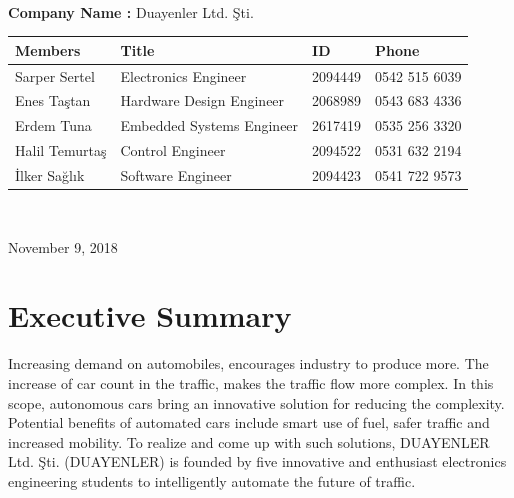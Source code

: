 \documentclass[a4paper,12pt]{article}
\begin{document}
\begin{titlepage}
\begin{minipage}[r]{0.35\textwidth}
\end{minipage}\\[1cm]
\begin{minipage}{\textwidth}
	\begin{flushleft}
		\large{\textbf{Company Name :}}	Duayenler Ltd. Şti.\\
		\begin{table}[H]
			\begin{tabular}{l l l l}
				\hline
				\textbf{Members}&\textbf{Title}& \textbf{ID}&\textbf{Phone} \\ \hline
				Sarper Sertel & Electronics Engineer& 2094449 & 0542 515 6039  \\ 
				Enes Taştan & Hardware Design Engineer & 2068989 & 0543 683 4336  \\ 
				Erdem Tuna & Embedded Systems Engineer& 2617419 & 0535 256 3320  \\ 
				Halil Temurtaş & Control Engineer& 2094522 & 0531 632 2194  \\
				İlker Sağlık & Software Engineer& 2094423 & 0541 722 9573  \\ \hline
				
				
			\end{tabular}
		\end{table}
	\end{flushleft}
\end{minipage}\\[1cm]

\begin{flushbottom}
{\large November 9, 2018} %
\end{flushbottom}

\end{titlepage}

\blankpage
\tableofcontents
\newpage

\section{Executive Summary}

	Increasing demand on automobiles, encourages industry to produce more. The increase of car count in the traffic, makes the traffic flow more complex. In this scope, autonomous cars bring an innovative solution for reducing the complexity. Potential benefits of automated cars include smart use of fuel, safer traffic and increased mobility. To realize and come up with such solutions, DUAYENLER Ltd. Şti. (DUAYENLER) is founded by five innovative and enthusiast electronics engineering students to intelligently automate the future of traffic.\\
	
\end{document}

